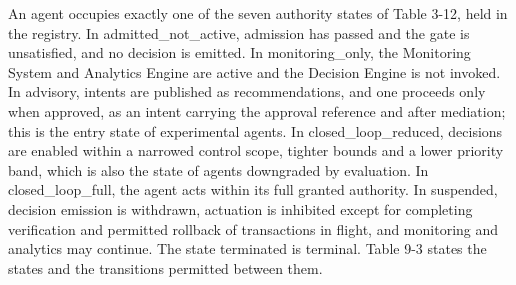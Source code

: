 An agent occupies exactly one of the seven authority states of Table
3-12, held in the registry. In
admitted\_\allowbreak{}not\_\allowbreak{}active, admission has passed
and the gate is unsatisfied, and no decision is emitted. In
monitoring\_\allowbreak{}only, the Monitoring System and Analytics
Engine are active and the Decision Engine is not invoked. In advisory,
intents are published as recommendations, and one proceeds only when
approved, as an intent carrying the approval reference and after
mediation; this is the entry state of experimental agents. In
closed\_\allowbreak{}loop\_\allowbreak{}reduced, decisions are enabled
within a narrowed control scope, tighter bounds and a lower priority
band, which is also the state of agents downgraded by evaluation. In
closed\_\allowbreak{}loop\_\allowbreak{}full, the agent acts within its
full granted authority. In suspended, decision emission is withdrawn,
actuation is inhibited except for completing verification and permitted
rollback of transactions in flight, and monitoring and analytics may
continue. The state terminated is terminal. Table 9-3 states the states
and the transitions permitted between them.

